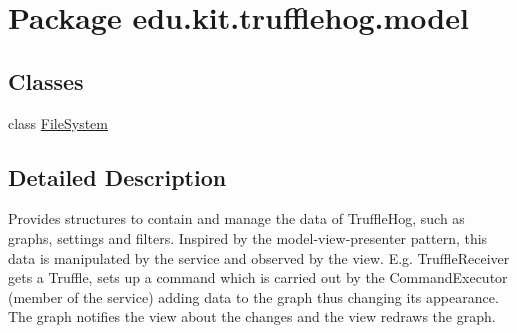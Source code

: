 \hypertarget{namespaceedu_1_1kit_1_1trufflehog_1_1model}{}\section{Package edu.\+kit.\+trufflehog.\+model}
\label{namespaceedu_1_1kit_1_1trufflehog_1_1model}
\subsection*{Classes}
\begin{DoxyCompactItemize}
\item 
class \hyperlink{classedu_1_1kit_1_1trufflehog_1_1model_1_1_file_system}{File\+System}
\end{DoxyCompactItemize}


\subsection{Detailed Description}
Provides structures to contain and manage the data of Truffle\+Hog, such as graphs, settings and filters. Inspired by the model-\/view-\/presenter pattern, this data is manipulated by the service and observed by the view. E.\+g. Truffle\+Receiver gets a Truffle, sets up a command which is carried out by the Command\+Executor (member of the service) adding data to the graph thus changing its appearance. The graph notifies the view about the changes and the view redraws the graph. 